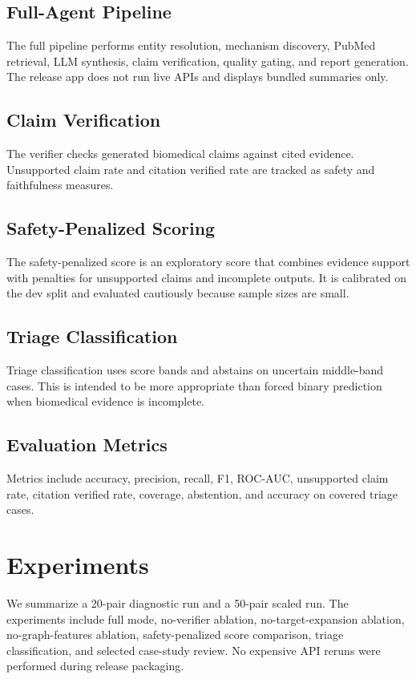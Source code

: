 \documentclass[11pt]{article}
\begin{document}
\subsection{Full-Agent Pipeline}
The full pipeline performs entity resolution, mechanism discovery, PubMed retrieval, LLM synthesis, claim verification, quality gating, and report generation. The release app does not run live APIs and displays bundled summaries only.

\subsection{Claim Verification}
The verifier checks generated biomedical claims against cited evidence. Unsupported claim rate and citation verified rate are tracked as safety and faithfulness measures.

\subsection{Safety-Penalized Scoring}
The safety-penalized score is an exploratory score that combines evidence support with penalties for unsupported claims and incomplete outputs. It is calibrated on the dev split and evaluated cautiously because sample sizes are small.

\subsection{Triage Classification}
Triage classification uses score bands and abstains on uncertain middle-band cases. This is intended to be more appropriate than forced binary prediction when biomedical evidence is incomplete.

\subsection{Evaluation Metrics}
Metrics include accuracy, precision, recall, F1, ROC-AUC, unsupported claim rate, citation verified rate, coverage, abstention, and accuracy on covered triage cases.

\section{Experiments}
We summarize a 20-pair diagnostic run and a 50-pair scaled run. The experiments include full mode, no-verifier ablation, no-target-expansion ablation, no-graph-features ablation, safety-penalized score comparison, triage classification, and selected case-study review. No expensive API reruns were performed during release packaging.
\end{document}
